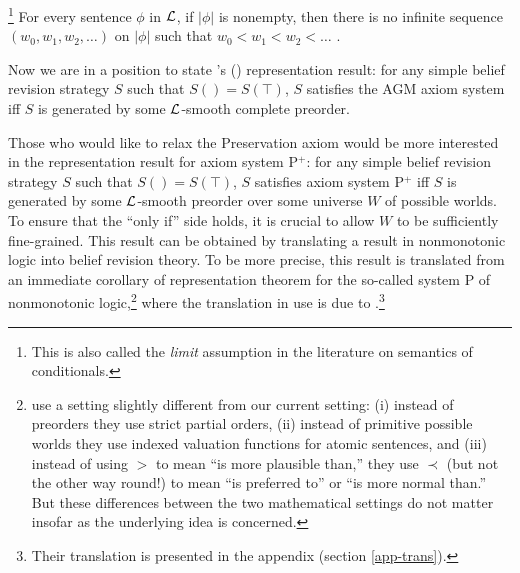 	\footnote
		{
		This is also called the {\em limit} assumption in the literature on semantics of conditionals. 
		}
	For every sentence $\phi$ in ${\cal L}$, if $|\phi|$ is nonempty, then there is no infinite sequence $(w_0, w_1, w_2, \dots)$ on $|\phi|$ such that $w_0 < w_1 < w_2 < \ldots$ .

\ed %



Now we are in a position to state \citeauthor{grove1988two}'s () representation result: for any simple belief revision strategy $S$ such that $S() = S(\top)$, $S$ satisfies the AGM axiom system iff $S$ is generated by some ${\cal L}$-smooth complete preorder.

Those who would like to relax the Preservation axiom would be more interested in the representation result for axiom system P$^+$: for any simple belief revision strategy $S$ such that $S() = S(\top)$, $S$ satisfies axiom system P$^+$ iff $S$ is generated by some ${\cal L}$-smooth preorder over some universe $W$ of possible worlds. To ensure that the ``only if'' side holds, it is crucial to allow $W$ to be sufficiently fine-grained. This result can be obtained by translating a result in nonmonotonic logic into belief revision theory. To be more precise, this result is translated
from an immediate corollary of  representation theorem for the so-called system P of nonmonotonic logic,\footnote
	{
	\citet*{kraus1990nonmonotonic} use a setting slightly different from our current setting: (i) instead of preorders they use strict partial orders, (ii) instead of primitive possible worlds they use indexed valuation functions for atomic sentences, and (iii) instead of using $>$ to mean ``is more plausible than,'' they use $\prec$ (but not the other way round!) to mean ``is preferred to'' or ``is more normal than.'' But these differences between the two mathematical settings do not matter insofar as the underlying idea is concerned.
	}
where the translation in use is due to \citet*{makinson1991relations}.\footnote 
	{
	Their translation is presented in the appendix (section \ref{app-trans}).
	}

